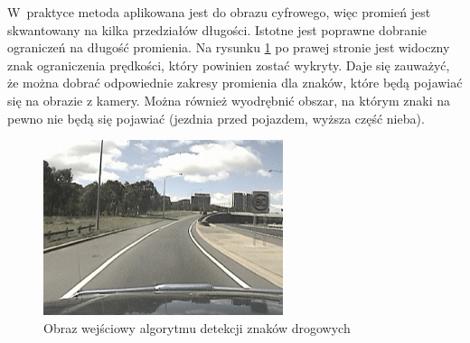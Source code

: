 W~praktyce metoda aplikowana jest do obrazu cyfrowego, więc promień jest skwantowany na kilka przedziałów długości.
Istotne jest poprawne dobranie ograniczeń na długość promienia. 
Na rysunku \ref{fig:tsd} po prawej stronie jest widoczny znak ograniczenia prędkości, który powinien zostać wykryty. 
Daje się zauważyć, że można dobrać odpowiednie zakresy promienia dla znaków, które będą pojawiać się na obrazie z kamery. 
Można również wyodrębnić obszar, na którym znaki na pewno nie będą się pojawiać (jezdnia przed pojazdem, wyższa część nieba). 

\begin{figure}
  \centering
  \includegraphics[width=7cm]{img/znaki1.png}
  \caption{Obraz wejściowy algorytmu detekcji znaków drogowych\cite{T2}}
  \label{fig:tsd}
\end{figure}


